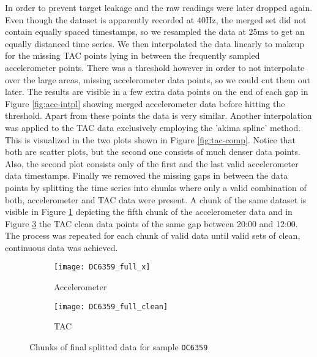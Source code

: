 In order to prevent target leakage and the raw readings were later dropped again.
Even though the dataset is apparently recorded at $40\si{\hertz}$, the merged set did not contain equally spaced timestamps, so we resampled the data at $25\si{\milli\second}$ to get an equally distanced time series.
We then interpolated the data linearly to makeup for the missing TAC points lying in between the frequently sampled accelerometer points.
There was a threshold however in order to not interpolate over the large areas, missing accelerometer data points, so we could cut them out later.
The results are visible in a few extra data points on the end of each gap in Figure \ref{fig:acc-intpl} showing merged accelerometer data before hitting the threshold.
Apart from these points the data is very similar.
Another interpolation was applied to the TAC data exclusively employing the 'akima spline' method.
This is visualized in the two plots shown in Figure \ref{fig:tac-comp}.
Notice that both are scatter plots, but the second one consists of much denser data points.
Also, the second plot consists only of the first and the last valid accelerometer data timestamps.
Finally we removed the missing gaps in between the data points by splitting the time series into chunks where only a valid combination of both, accelerometer and TAC data were present.
A chunk of the same dataset is visible in Figure \ref{fig:acc-chunk} depicting the fifth chunk of the accelerometer data and in Figure \ref{fig:tac-chunk} the TAC clean data points of the same gap between 20:00 and 12:00.
The process was repeated for each chunk of valid data until valid sets of clean, continuous data was achieved.

\begin{figure}[h]
	\begin{subfigure}[c]{0.49\columnwidth}
		\centering
		\texttt{[image: DC6359\_full\_x]}
		\caption{Accelerometer}
		\label{fig:acc-chunk}		
	\end{subfigure}\hfill%
	\begin{subfigure}[c]{0.49\columnwidth}
		\centering
		\texttt{[image: DC6359\_full\_clean]}
		\caption{TAC}
		\label{fig:tac-chunk}
	\end{subfigure}
	\caption{Chunks of final splitted data for sample \texttt{DC6359}}
\end{figure}


